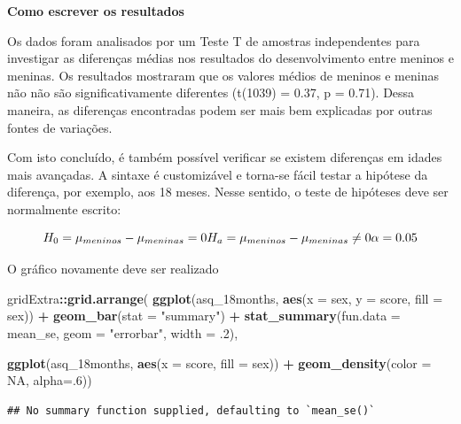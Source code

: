 \documentclass[
]{book}
\newenvironment{Shaded}{\begin{snugshade}}{\end{snugshade}}
\newcommand{\DataTypeTok}[1]{\textcolor[rgb]{0.13,0.29,0.53}{#1}}
\newcommand{\DecValTok}[1]{\textcolor[rgb]{0.00,0.00,0.81}{#1}}
\newcommand{\FloatTok}[1]{\textcolor[rgb]{0.00,0.00,0.81}{#1}}
\newcommand{\KeywordTok}[1]{\textcolor[rgb]{0.13,0.29,0.53}{\textbf{#1}}}
\newcommand{\NormalTok}[1]{#1}
\newcommand{\OperatorTok}[1]{\textcolor[rgb]{0.81,0.36,0.00}{\textbf{#1}}}
\newcommand{\OtherTok}[1]{\textcolor[rgb]{0.56,0.35,0.01}{#1}}
\newcommand{\StringTok}[1]{\textcolor[rgb]{0.31,0.60,0.02}{#1}}
\begin{document}
\begin{writing}
\textbf{Como escrever os resultados}

Os dados foram analisados por um Teste T de amostras independentes para
investigar as diferenças médias nos resultados do desenvolvimento entre
meninos e meninas. Os resultados mostraram que os valores médios de
meninos e meninas não não são significativamente diferentes (t(1039) =
0.37, p = 0.71). Dessa maneira, as diferenças encontradas podem ser mais
bem explicadas por outras fontes de variações.
\end{writing}

Com isto concluído, é também possível verificar se existem diferenças em idades mais avançadas. A sintaxe é customizável e torna-se fácil testar a hipótese da diferença, por exemplo, aos 18 meses. Nesse sentido, o teste de hipóteses deve ser normalmente escrito:

\[H_0 = \mu_{meninos} - \mu_{meninas} = 0 \\ H_a = \mu_{meninos} - \mu_{meninas} \neq 0 \\ \alpha = 0.05\]

O gráfico novamente deve ser realizado

\begin{Shaded}
\begin{Highlighting}[]
\NormalTok{gridExtra}\OperatorTok{::}\KeywordTok{grid.arrange}\NormalTok{(}
  \KeywordTok{ggplot}\NormalTok{(asq_18months, }\KeywordTok{aes}\NormalTok{(}\DataTypeTok{x =}\NormalTok{ sex, }\DataTypeTok{y =}\NormalTok{ score, }\DataTypeTok{fill =}\NormalTok{ sex)) }\OperatorTok{+}
\StringTok{  }\KeywordTok{geom_bar}\NormalTok{(}\DataTypeTok{stat =} \StringTok{"summary"}\NormalTok{) }\OperatorTok{+}
\StringTok{  }\KeywordTok{stat_summary}\NormalTok{(}\DataTypeTok{fun.data =}\NormalTok{ mean_se, }\DataTypeTok{geom =} \StringTok{"errorbar"}\NormalTok{, }\DataTypeTok{width =} \FloatTok{.2}\NormalTok{),}

  \KeywordTok{ggplot}\NormalTok{(asq_18months, }\KeywordTok{aes}\NormalTok{(}\DataTypeTok{x =}\NormalTok{ score, }\DataTypeTok{fill =}\NormalTok{ sex)) }\OperatorTok{+}\StringTok{ }
\StringTok{  }\KeywordTok{geom_density}\NormalTok{(}\DataTypeTok{color =} \OtherTok{NA}\NormalTok{, }\DataTypeTok{alpha=}\NormalTok{.}\DecValTok{6}\NormalTok{))}
\end{Highlighting}
\end{Shaded}

\begin{verbatim}
## No summary function supplied, defaulting to `mean_se()`
\end{verbatim}
\end{document}

